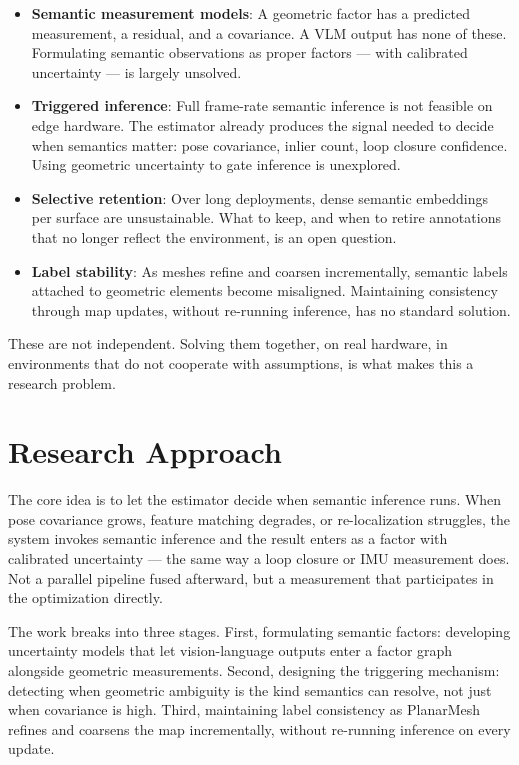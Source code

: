 \documentclass[11pt,a4paper]{article}
\begin{document}
\begin{itemize}
  \item \textbf{Semantic measurement models}: A geometric factor 
  has a predicted measurement, a residual, and a covariance. 
  A VLM output has none of these. Formulating semantic observations 
  as proper factors — with calibrated uncertainty — is largely 
  unsolved.

  \item \textbf{Triggered inference}: Full frame-rate semantic 
  inference is not feasible on edge hardware. The estimator already 
  produces the signal needed to decide when semantics matter: pose 
  covariance, inlier count, loop closure confidence. Using geometric 
  uncertainty to gate inference is unexplored.

  \item \textbf{Selective retention}: Over long deployments, dense 
  semantic embeddings per surface are unsustainable. What to keep, 
  and when to retire annotations that no longer reflect the 
  environment, is an open question.

  \item \textbf{Label stability}: As meshes refine and coarsen 
  incrementally, semantic labels attached to geometric elements 
  become misaligned. Maintaining consistency through map updates, 
  without re-running inference, has no standard solution.
\end{itemize}

These are not independent. Solving them together, on real hardware, 
in environments that do not cooperate with assumptions, is what makes 
this a research problem.

\section*{Research Approach}

The core idea is to let the estimator decide when semantic inference 
runs. When pose covariance grows, feature matching degrades, or 
re-localization struggles, the system invokes semantic inference and 
the result enters as a factor with calibrated uncertainty — the same 
way a loop closure or IMU measurement does. Not a parallel pipeline 
fused afterward, but a measurement that participates in the 
optimization directly.

The work breaks into three stages. First, formulating semantic 
factors: developing uncertainty models that let vision-language 
outputs enter a factor graph alongside geometric measurements. 
Second, designing the triggering mechanism: detecting when geometric 
ambiguity is the kind semantics can resolve, not just when covariance 
is high. Third, maintaining label consistency as PlanarMesh 
\cite{wang2025planarmesh} refines and coarsens the map incrementally, 
without re-running inference on every update.
\end{document}
